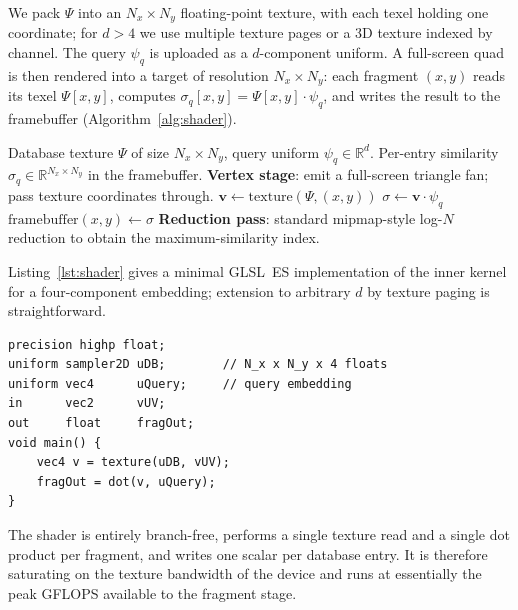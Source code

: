 \documentclass[twocolumn,11pt,a4paper]{article}
\theoremstyle{definition}
\theoremstyle{remark}
\newcommand{\R}{\mathbb{R}}
\begin{document}
We pack $\Psi$ into an $N_x \times N_y$ floating-point texture, with
each texel holding one coordinate; for $d > 4$ we use multiple texture pages
or a 3D texture indexed by channel. The query $\psi_q$ is uploaded as a
$d$-component uniform. A full-screen quad is then rendered into a target of
resolution $N_x \times N_y$: each fragment $(x, y)$ reads its texel
$\Psi[x, y]$, computes $\sigma_q[x, y] = \Psi[x, y] \cdot \psi_q$, and
writes the result to the framebuffer (Algorithm~\ref{alg:shader}).

\begin{algorithm}[t]
\caption{Fragment-shader first-pass similarity kernel.}
\label{alg:shader}
\begin{algorithmic}[1]
\Require Database texture $\Psi$ of size $N_x \times N_y$, query uniform
$\psi_q \in \R^d$.
\Ensure Per-entry similarity $\sigma_q \in \R^{N_x \times N_y}$ in the
framebuffer.
\State \textbf{Vertex stage}: emit a full-screen triangle fan; pass texture
coordinates through.
    \State $\mathbf{v} \gets \mathrm{texture}(\Psi, (x, y))$
    \State $\sigma \gets \mathbf{v} \cdot \psi_q$
    \State $\mathrm{framebuffer}(x, y) \gets \sigma$
\EndFor
\State \textbf{Reduction pass}: standard mipmap-style log-$N$ reduction to
obtain the maximum-similarity index.
\end{algorithmic}
\end{algorithm}

Listing~\ref{lst:shader} gives a minimal GLSL~ES implementation of the inner
kernel for a four-component embedding; extension to arbitrary $d$ by texture
paging is straightforward.

\begin{lstlisting}[style=glsl,caption={GLSL~ES fragment shader implementing
Eq.~\ref{eq:shader:op} for $d = 4$. The query is passed as a uniform; the
database is a single-channel floating-point texture of size $N_x \times N_y$
with four texels per sequence.},label=lst:shader]
precision highp float;
uniform sampler2D uDB;        // N_x x N_y x 4 floats
uniform vec4      uQuery;     // query embedding
in      vec2      vUV;
out     float     fragOut;
void main() {
    vec4 v = texture(uDB, vUV);
    fragOut = dot(v, uQuery);
}
\end{lstlisting}

The shader is entirely branch-free, performs a single texture read and a
single dot product per fragment, and writes one scalar per database entry.
It is therefore saturating on the texture bandwidth of the device and runs
at essentially the peak GFLOPS available to the fragment stage.
\end{document}
